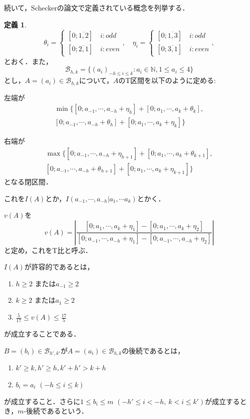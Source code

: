 \documentclass[10pt,a4paper]{ujarticle}
\theoremstyle{definition}
\newtheorem{definition}{定義}
\begin{document}
続いて，Scheckerの論文で定義されている概念を列挙する．
\begin{definition}
  \[
  \theta_i = \begin{cases}
    [0; \overline{1, 2}] \quad i : odd \\
    [0; \overline{2, 1}] \quad i : even
  \end{cases}, \quad 
  \eta_i = \begin{cases}
    [0; \overline{1, 3}] \quad i : odd \\
    [0; \overline{3, 1}] \quad i : even
  \end{cases},
  \]
  とおく．また，
  \[
  \mathcal{B}_{h,k} = \{ (a_i)_{-h \le i \le k} : a_i\in \mathbb{N}, 1\le a_i \le 4 \}
  \]
  とし，$A = (a_i) \in \mathcal{B}_{h,k}$について，$A$のT区間を以下のように定める:

  左端が
  \begin{align*}
    \min \{[0; a_{-1},\cdots , a_{-h} + \eta_h] + [0; a_1,\cdots , a_{k} + \theta_k],\\
    [0; a_{-1},\cdots , a_{-h} + \theta_h] + [0; a_1,\cdots , a_{k} + \eta_k] \}
  \end{align*}

  右端が
  \begin{align*}
    \max \{[0; a_{-1},\cdots , a_{-h} + \eta_{h + 1}] + [0; a_1,\cdots , a_k + \theta_{k + 1}],\\
    [0; a_{-1},\cdots , a_{-h} + \theta_{h + 1}] + [0; a_1,\cdots , a_{k} + \eta_{k + 1}] \}
  \end{align*}
  となる閉区間．

  これを$I(A)$とか，$I(a_{-1},\cdots, a_{-h} | a_1, \cdots a_k)$とかく．

  $v(A)$を
  \[
  v(A) = \left| \frac{[0; a_1,\cdots, a_k + \eta_1] - [0; a_1,\cdots, a_k + \eta_2]}{[0; a_{-1},\cdots, a_{-h} + \eta_1] - [0; a_{-1},\cdots, a_{-h} + \eta_2]}\right|
  \]
  と定め，これをT比と呼ぶ．

  $I(A)$が許容的であるとは，\begin{enumerate}
    \item $h \ge 2$ または$a_{-1} \ge 2$
    \item $k \ge 2$ または$a_1 \ge 2$
    \item $\frac{5}{17} \le v(A) \le \frac{17}{5}$
  \end{enumerate}
  が成立することである．

  $B = (b_i) \in \mathcal{B}_{h',k'}$が$A = (a_i) \in \mathcal{B}_{h,k}$の後続であるとは，
  \begin{enumerate}
    \item $k'\ge k, h' \ge h , k' + h' > k + h$
    \item $b_i = a_i$ $(-h\le i \le k)$
  \end{enumerate}
  が成立すること．さらに$1 \le b_i \le m$ $(-h' \le i < -h,\ k < i \le k')$が成立するとき，$m$-後続であるという．
\end{definition}
\end{document}
